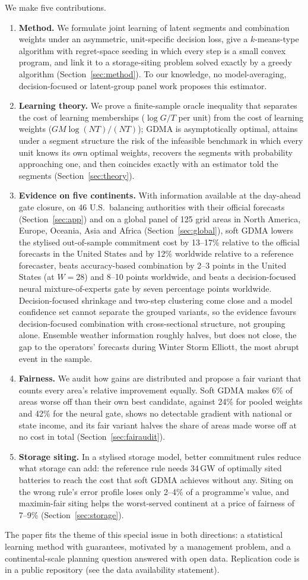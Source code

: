 We make five contributions.
\begin{enumerate}
\item \textbf{Method.} We formulate joint learning of latent segments and combination weights under an asymmetric, unit-specific decision loss, give a $k$-means-type algorithm with regret-space seeding in which every step is a small convex program, and link it to a storage-siting problem solved exactly by a greedy algorithm (Section~\ref{sec:method}).
To our knowledge, no model-averaging, decision-focused or latent-group panel work \citep{BonhommeManresa2015,Su2016} proposes this estimator.
\item \textbf{Learning theory.} We prove a finite-sample oracle inequality that separates the cost of learning memberships ($\log G/T$ per unit) from the cost of learning weights ($GM\log(NT)/(NT)$); GDMA is asymptotically optimal, attains under a segment structure the risk of the infeasible benchmark in which every unit knows its own optimal weights, recovers the segments with probability approaching one, and then coincides exactly with an estimator told the segments (Section~\ref{sec:theory}).
\item \textbf{Evidence on five continents.} With information available at the day-ahead gate closure, on 46 U.S.\ balancing authorities with their official forecasts (Section~\ref{sec:app}) and on a global panel of 125 grid areas in North America, Europe, Oceania, Asia and Africa (Section~\ref{sec:global}), soft GDMA lowers the stylised out-of-sample commitment cost by 13--17\% relative to the official forecasts in the United States and by 12\% worldwide relative to a reference forecaster, beats accuracy-based combination by 2--3 points in the United States (at $W=28$) and 8--10 points worldwide, and beats a decision-focused neural mixture-of-experts gate by seven percentage points worldwide. Decision-focused shrinkage and two-step clustering come close and a model confidence set cannot separate the grouped variants, so the evidence favours decision-focused combination with cross-sectional structure, not grouping alone. Ensemble weather information roughly halves, but does not close, the gap to the operators' forecasts during Winter Storm Elliott, the most abrupt event in the sample.
\item \textbf{Fairness.} We audit how gains are distributed and propose a fair variant that counts every area's relative improvement equally. Soft GDMA makes 6\% of areas worse off than their own best candidate, against 24\% for pooled weights and 42\% for the neural gate, shows no detectable gradient with national or state income, and its fair variant halves the share of areas made worse off at no cost in total (Section~\ref{sec:fairaudit}).
\item \textbf{Storage siting.} In a stylised storage model, better commitment rules reduce what storage can add: the reference rule needs 34\,GW of optimally sited batteries to reach the cost that soft GDMA achieves without any. Siting on the wrong rule's error profile loses only 2--4\% of a programme's value, and maximin-fair siting helps the worst-served continent at a price of fairness of 7--9\% (Section~\ref{sec:storage}).
\end{enumerate}

The paper fits the theme of this special issue in both directions: a statistical learning method with guarantees, motivated by a management problem, and a continental-scale planning question answered with open data.
Replication code is in a public repository (see the data availability statement).
